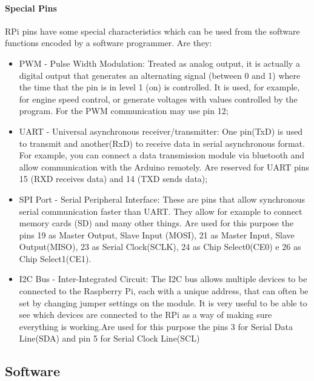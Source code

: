 \documentclass{acm_proc_article-sp}
\begin{document}
\paragraph{Special Pins}
RPi pins have some special characteristics which can be used from the software functions encoded by a software programmer. Are they:
\begin{itemize}

\item PWM - Pulse Width Modulation: Treated as analog output, it is actually a digital output that generates an alternating signal (between 0 and 1) where the time that the pin is in level 1 (on) is controlled. It is used, for example, for engine speed control, or generate voltages with values controlled by the program. For the PWM communication may use pin 12;

\item UART - Universal asynchronous receiver/transmitter: One pin(TxD) is used to transmit and another(RxD) to receive data in serial asynchronous format. For example, you can connect a data transmission module via bluetooth and allow communication with the Arduino remotely. Are reserved for UART pins 15 (RXD receives data) and 14 (TXD sends data);%

\item SPI Port - Serial Peripheral Interface: These are pins that allow synchronous serial communication faster than UART. They allow for example to connect memory cards (SD) and many other things. Are used for this purpose the pins 19 as Master Output, Slave Input (MOSI), 21 as Master Input, Slave Output(MISO), 23 as Serial Clock(SCLK), 24 as Chip Select0(CE0) e 26 as Chip Select1(CE1).

\item I2C Bus - Inter-Integrated Circuit: The I2C bus allows multiple devices to be connected to the Raspberry Pi, each with a unique address, that can often be set by changing jumper settings on the module. It is very useful to be able to see which devices are connected to the RPi as a way of making sure everything is working.Are used for this purpose the pins 3 for Serial Data Line(SDA) and pin 5 for Serial Clock Line(SCL)
\end{itemize}

\subsection{Software}
\end{document}
